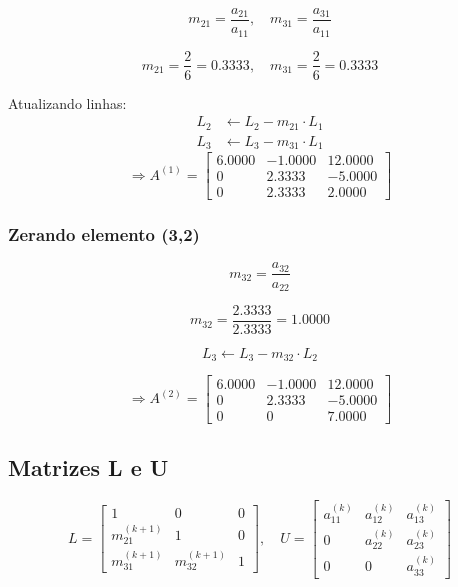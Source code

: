 \documentclass[12pt,a4paper]{article}
\begin{document}
\[
m_{21} = \frac{a_{21}}{a_{11}},\quad
m_{31} = \frac{a_{31}}{a_{11}}
\]

\[
m_{21} = \frac{2}{6} = 0.3333,\quad
m_{31} = \frac{2}{6} = 0.3333
\]

Atualizando linhas:
\begin{align*}
L_2 &\leftarrow L_2 - m_{21} \cdot L_1 \\
L_3 &\leftarrow L_3 - m_{31} \cdot L_1
\end{align*}
\[
\Rightarrow
\text{$A^{(1)} =$}
\begin{bmatrix}
6.0000 & -1.0000 & 12.0000 \\
0      & 2.3333  & -5.0000 \\
0      & 2.3333  & 2.0000
\end{bmatrix}
\]

\subsubsection{Zerando elemento (3,2)}

\[
m_{32} = \frac{a_{32}}{a_{22}}
\]

\[
m_{32} = \frac{2.3333}{2.3333} = 1.0000
\]

\[
L_3 \leftarrow L_3 - m_{32} \cdot L_2
\]

\[
\Rightarrow
\text{$A^{(2)} =$}
\begin{bmatrix}
6.0000 & -1.0000 & 12.0000 \\
0      & 2.3333  & -5.0000 \\
0      & 0       & 7.0000
\end{bmatrix}
\]

\subsection{Matrizes L e U}

\[
L =
\begin{bmatrix}
1      & 0      & 0 \\
m_{21}^{(k+1)} & 1      & 0 \\
m_{31}^{(k+1)} & m_{32}^{(k+1)} & 1
\end{bmatrix},
\quad
U =
\begin{bmatrix}
a_{11}^{(k)} & a_{12}^{(k)} & a_{13}^{(k)} \\
0      & a_{22}^{(k)}  & a_{23}^{(k)} \\
0      & 0       & a_{33}^{(k)}
\end{bmatrix}
\]

\vspace{1cm}
\end{document}
